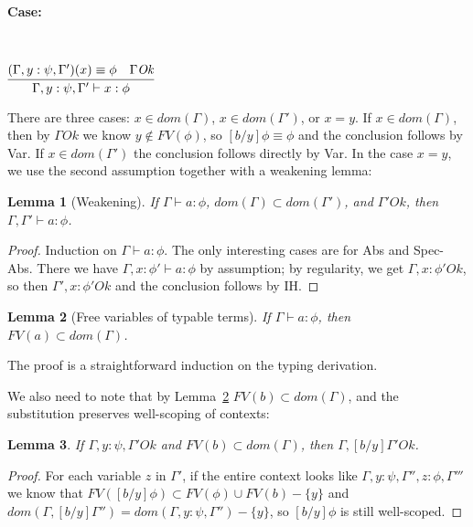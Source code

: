 \documentclass[copyright]{eptcs}
\newtheorem{lemma}{Lemma}
\begin{document}
\ 

\noindent \textbf{Case:}

\

$\infer{\Gamma,y:\psi,\Gamma'\vdash x:\phi}{(\Gamma,y:\psi,\Gamma')(x) \equiv \phi & \Gamma \mathit{Ok}}$

There are three cases: $x \in dom(\Gamma)$, $x \in dom(\Gamma')$, or $x = y$. If $x \in dom(\Gamma)$, then by $\Gamma \mathit{Ok}$ we know $y \not\in FV(\phi)$, so $[b/y]\phi \equiv \phi$ and the conclusion follows by Var. If $x \in dom(\Gamma')$ the conclusion follows directly by Var. In the case $x = y$, we use the second assumption together with a weakening lemma:

\begin{lemma}[Weakening]
\label{lem:weak}
If $\Gamma \vdash a : \phi$, $\textit{dom}(\Gamma) \subset \textit{dom}(\Gamma')$, and $\Gamma' \mathit{Ok}$, then $\Gamma,\Gamma' \vdash a : \phi$.
\end{lemma}
\begin{proof}
Induction on $\Gamma \vdash a : \phi$. The only interesting cases are for Abs and Spec-Abs. There we have $\Gamma, x:\phi' \vdash a : \phi$ by assumption; by regularity, we get $\Gamma, x:\phi' \mathit{Ok}$, so then $\Gamma', x:\phi' \mathit{Ok}$ and the conclusion follows by IH.
\end{proof}

\begin{lemma}[Free variables of typable terms]
\label{lem:vars}
If $\Gamma\vdash a:\phi$, then $\textit{FV}(a)\subset\textit{dom}(\Gamma)$.
\end{lemma}
\noindent The proof is a straightforward induction on the typing
derivation.

We also need to note that by Lemma~\ref{lem:vars} $\mathit{FV}(b) \subset \mathit{dom}(\Gamma)$, and the substitution preserves well-scoping of contexts:

\begin{lemma}
If $\Gamma, y:\psi, \Gamma' \mathit{Ok}$ and $\mathit{FV}(b)\subset \mathit{dom}(\Gamma)$, then $\Gamma, [b/y]\Gamma' \mathit{Ok}$.
\end{lemma}
\begin{proof}
For each variable $z$ in $\Gamma'$, if the entire context looks like  $\Gamma, y:\psi, \Gamma'', z:\phi, \Gamma'''$ we know that $\mathit{FV}([b/y]\phi) \subset \mathit{FV}(\phi)\cup\mathit{FV}(b)-\{y\}$ and $\mathit{dom}(\Gamma, [b/y]\Gamma'') = \mathit{dom}(\Gamma, y:\psi, \Gamma'') - \{y\}$, so $[b/y]\phi$ is still well-scoped.
\end{proof}
\end{document}
